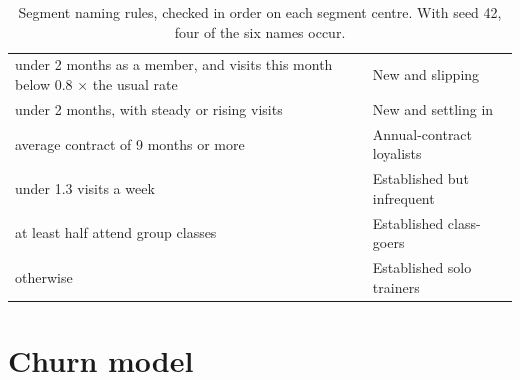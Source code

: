 \begin{table}[tb]
  \caption{Segment naming rules, checked in order on each segment centre. With seed 42, four of the six names occur.}
  \label{tab:naming}
  \begin{tabularx}{\linewidth}{@{}L l@{}}
    \toprule
     &  \\
    \midrule
    under 2 months as a member, and visits this month below 0.8 × the usual rate & New and slipping \\
    under 2 months, with steady or rising visits & New and settling in \\
    average contract of 9 months or more & Annual-contract loyalists \\
    under 1.3 visits a week & Established but infrequent \\
    at least half attend group classes & Established class-goers \\
    otherwise & Established solo trainers \\
    \bottomrule
  \end{tabularx}
\end{table}

\section{Churn model}
\label{sec:churn}

